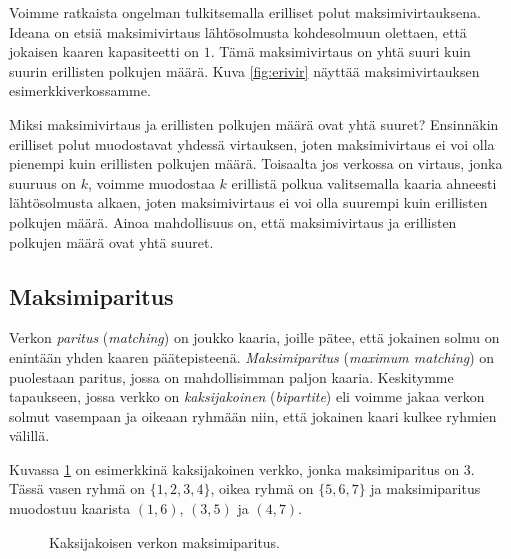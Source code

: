 Voimme ratkaista ongelman
tulkitsemalla erilliset polut maksimivirtauksena.
Ideana on etsiä maksimivirtaus lähtösolmusta kohdesolmuun
olettaen, että jokaisen kaaren kapasiteetti on $1$.
Tämä maksimivirtaus on yhtä suuri kuin suurin
erillisten polkujen määrä.
Kuva \ref{fig:erivir} näyttää maksimivirtauksen
esimerkkiverkossamme.

Miksi maksimivirtaus ja erillisten polkujen määrä ovat yhtä suuret?
Ensinnäkin erilliset polut muodostavat yhdessä virtauksen,
joten maksimivirtaus ei voi olla pienempi kuin erillisten polkujen määrä.
Toisaalta jos verkossa on virtaus, jonka suuruus on $k$,
voimme muodostaa $k$ erillistä polkua
valitsemalla kaaria ahneesti lähtösolmusta alkaen,
joten maksimivirtaus ei voi olla suurempi kuin erillisten polkujen määrä.
Ainoa mahdollisuus on, että maksimivirtaus ja erillisten polkujen määrä
ovat yhtä suuret.

\subsection{Maksimiparitus}


Verkon \emph{paritus} (\emph{matching}) on joukko kaaria, joille pätee,
että jokainen solmu on enintään yhden kaaren päätepisteenä.
\emph{Maksimiparitus} (\emph{maximum matching}) on puolestaan paritus,
jossa on mahdollisimman paljon kaaria.
Keskitymme tapaukseen,
jossa verkko on \emph{kaksijakoinen} (\emph{bipartite}) eli
voimme jakaa verkon solmut
vasempaan ja oikeaan ryhmään niin, että jokainen
kaari kulkee ryhmien välillä.

Kuvassa \ref{fig:makpar} on esimerkkinä kaksijakoinen verkko,
jonka maksimiparitus on $3$.
Tässä vasen ryhmä on $\{1,2,3,4\}$, oikea ryhmä on $\{5,6,7\}$
ja maksimiparitus muodostuu kaarista
$(1,6)$, $(3,5)$ ja $(4,7)$.

\begin{figure}
\center
\begin{center}
\end{center}
\caption{Kaksijakoisen verkon maksimiparitus.}
\label{fig:makpar}
\end{figure}

